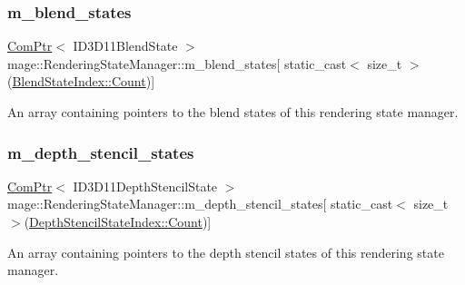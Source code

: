 \subsubsection{\texorpdfstring{m\+\_\+blend\+\_\+states}{m\_blend\_states}}
{\footnotesize\ttfamily \hyperlink{namespacemage_ae74f374780900893caa5555d1031fd79}{Com\+Ptr}$<$ I\+D3\+D11\+Blend\+State $>$ mage\+::\+Rendering\+State\+Manager\+::m\+\_\+blend\+\_\+states\mbox{[} static\+\_\+cast$<$ size\+\_\+t $>$(\hyperlink{classmage_1_1_rendering_state_manager_a499a47606ff73352331177b668c4b64cae93f994f01c537c4e2f7d8528c3eb5e9}{Blend\+State\+Index\+::\+Count})\mbox{]}\hspace{0.3cm}{\ttfamily [private]}}

An array containing pointers to the blend states of this rendering state manager. \hypertarget{classmage_1_1_rendering_state_manager_a8bd01105789b3aac90ee56a0322f98e8}{}\label{classmage_1_1_rendering_state_manager_a8bd01105789b3aac90ee56a0322f98e8} 
\subsubsection{\texorpdfstring{m\+\_\+depth\+\_\+stencil\+\_\+states}{m\_depth\_stencil\_states}}
{\footnotesize\ttfamily \hyperlink{namespacemage_ae74f374780900893caa5555d1031fd79}{Com\+Ptr}$<$ I\+D3\+D11\+Depth\+Stencil\+State $>$ mage\+::\+Rendering\+State\+Manager\+::m\+\_\+depth\+\_\+stencil\+\_\+states\mbox{[} static\+\_\+cast$<$ size\+\_\+t $>$(\hyperlink{classmage_1_1_rendering_state_manager_a7a8ab9ab2d4eb992a364d09c9eec636aae93f994f01c537c4e2f7d8528c3eb5e9}{Depth\+Stencil\+State\+Index\+::\+Count})\mbox{]}\hspace{0.3cm}{\ttfamily [private]}}

An array containing pointers to the depth stencil states of this rendering state manager. \hypertarget{classmage_1_1_rendering_state_manager_aa9ecd4ca82954b3d457e811bf44d835a}{}\label{classmage_1_1_rendering_state_manager_aa9ecd4ca82954b3d457e811bf44d835a} 
